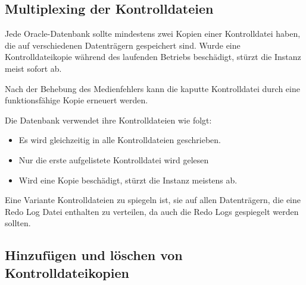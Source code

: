      \subsection{Multiplexing der Kontrolldateien}
        Jede Oracle-Datenbank sollte mindestens zwei Kopien einer Kontrolldatei
        haben, die auf verschiedenen Datentr\"agern gespeichert sind.
        Wurde eine Kontrolldateikopie w\"ahrend des laufenden Betriebs
        besch\"adigt, st\"urzt die Instanz meist sofort ab.

        Nach der Behebung des Medienfehlers kann die kaputte Kontrolldatei durch eine funktionsf\"ahige Kopie erneuert werden.

        Die Datenbank verwendet ihre Kontrolldateien wie folgt:
        \begin{itemize}
          \item Es wird gleichzeitig in alle Kontrolldateien geschrieben.
          \item Nur die erste aufgelistete Kontrolldatei wird gelesen
          \item Wird eine Kopie besch\"adigt, st\"urzt die Instanz meistens ab.
        \end{itemize}
        Eine Variante Kontrolldateien zu spiegeln ist, sie auf allen Datentr\"agern, die eine Redo Log Datei enthalten zu verteilen, da auch die Redo Logs gespiegelt werden sollten.
      \subsection{Hinzuf\"ugen und l\"oschen von Kontrolldateikopien}
